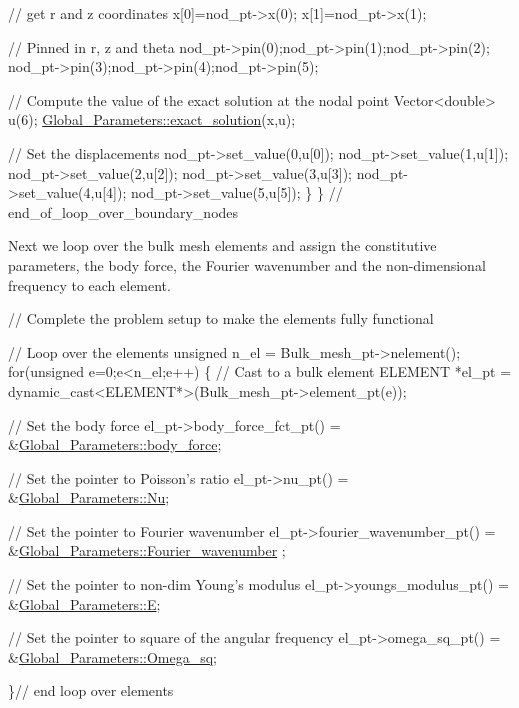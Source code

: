\begin{DoxyCodeInclude}
     \textcolor{comment}{// get r and z coordinates}
     x[0]=nod\_pt->x(0);
     x[1]=nod\_pt->x(1);
     
     \textcolor{comment}{// Pinned in r, z and theta}
     nod\_pt->pin(0);nod\_pt->pin(1);nod\_pt->pin(2);
     nod\_pt->pin(3);nod\_pt->pin(4);nod\_pt->pin(5);
     
     \textcolor{comment}{// Compute the value of the exact solution at the nodal point}
     Vector<double> u(6);
     \hyperlink{namespaceGlobal__Parameters_a6e53a9e4370e8719e9091eff6b6a0c01}{Global\_Parameters::exact\_solution}(x,u);
     
     \textcolor{comment}{// Set the displacements}
     nod\_pt->set\_value(0,u[0]);
     nod\_pt->set\_value(1,u[1]);
     nod\_pt->set\_value(2,u[2]);
     nod\_pt->set\_value(3,u[3]);
     nod\_pt->set\_value(4,u[4]);
     nod\_pt->set\_value(5,u[5]);
    \}
  \} \textcolor{comment}{// end\_of\_loop\_over\_boundary\_nodes}

\end{DoxyCodeInclude}


Next we loop over the bulk mesh elements and assign the constitutive parameters, the body force, the Fourier wavenumber and the non-\/dimensional frequency to each element.


\begin{DoxyCodeInclude}
 \textcolor{comment}{// Complete the problem setup to make the elements fully functional}

 \textcolor{comment}{// Loop over the elements}
 \textcolor{keywordtype}{unsigned} n\_el = Bulk\_mesh\_pt->nelement();
 \textcolor{keywordflow}{for}(\textcolor{keywordtype}{unsigned} e=0;e<n\_el;e++)
  \{
   \textcolor{comment}{// Cast to a bulk element}
   ELEMENT *el\_pt = \textcolor{keyword}{dynamic\_cast<}ELEMENT*\textcolor{keyword}{>}(Bulk\_mesh\_pt->element\_pt(e));

   \textcolor{comment}{// Set the body force}
   el\_pt->body\_force\_fct\_pt() = &\hyperlink{namespaceGlobal__Parameters_a8d30973505eeb753023936398bce5bcc}{Global\_Parameters::body\_force};

   \textcolor{comment}{// Set the pointer to Poisson's ratio}
   el\_pt->nu\_pt() = &\hyperlink{namespaceGlobal__Parameters_a5978c2a1498ec7775b228a11a3912209}{Global\_Parameters::Nu};

   \textcolor{comment}{// Set the pointer to Fourier wavenumber}
   el\_pt->fourier\_wavenumber\_pt() = &\hyperlink{namespaceGlobal__Parameters_ae1198385d90f52c4ed921520ae43a9e7}{Global\_Parameters::Fourier\_wavenumber}
      ;

   \textcolor{comment}{// Set the pointer to non-dim Young's modulus}
   el\_pt->youngs\_modulus\_pt() = &\hyperlink{namespaceGlobal__Parameters_ac74d762d76b56416281173421b018460}{Global\_Parameters::E};

   \textcolor{comment}{// Set the pointer to square of the angular frequency}
   el\_pt->omega\_sq\_pt() = &\hyperlink{namespaceGlobal__Parameters_aa7f960ed4311ccf6e3dbf9371f13876a}{Global\_Parameters::Omega\_sq};

  \}\textcolor{comment}{// end loop over elements}

\end{DoxyCodeInclude}


